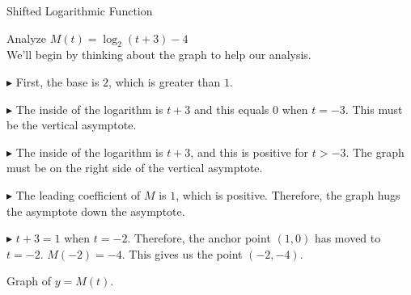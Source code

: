 \documentclass{ximera}
\begin{document}
\begin{example}  Shifted Logarithmic Function



Analyze   $M(t) = \log_2(t+3) - 4$ \\



We'll begin by thinking about the graph to help our analysis. \\


\begin{explanation}


$\blacktriangleright$ First, the base is $2$, which is greater than $1$.

$\blacktriangleright$ The inside of the logarithm is $t+3$ and this equals $0$ when $t=-3$.  This must be the vertical asymptote.

$\blacktriangleright$ The inside of the logarithm is $t+3$, and this is positive for $t>-3$.  The graph must be on the right side of the vertical asymptote.

$\blacktriangleright$ The leading coefficient of $M$ is $1$, which is positive.  Therefore, the graph hugs the asymptote down the asymptote. 

$\blacktriangleright$ $t+3=1$ when $t=-2$. Therefore, the anchor point $(1,0)$ has moved to $t = -2$.  $M(-2) = -4$.  This gives us the point $(-2, -4)$.





Graph of $y = M(t)$.

\begin{image}
\end{image}
\end{explanation}
\end{example}
\end{document}
